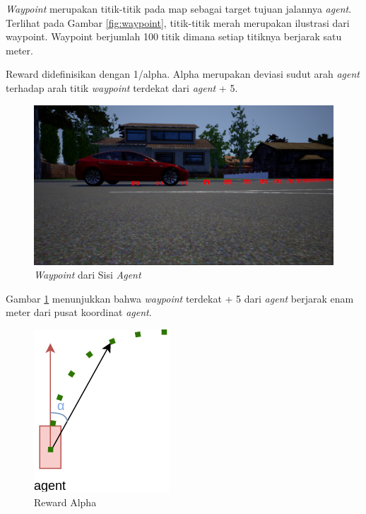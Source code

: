 \documentclass[conference]{IEEEtran}
\begin{document}
\textit{Waypoint} merupakan titik-titik pada map sebagai target tujuan jalannya \textit{agent}. Terlihat pada Gambar \ref{fig:waypoint}, titik-titik merah merupakan ilustrasi dari waypoint. Waypoint berjumlah 100 titik dimana setiap titiknya berjarak satu meter.

Reward didefinisikan dengan 1/alpha. Alpha merupakan deviasi sudut arah \textit{agent }terhadap arah titik \textit{waypoint} terdekat dari \textit{agent} + 5.

\begin{figure}[H] 
	\centering
	\includegraphics[width=1\linewidth]{images/waypoint_fromside}
	\caption{\textit{Waypoint }dari Sisi \textit{Agent}}
	\label{fig:waypoint_fromside}
\end{figure}

Gambar \ref{fig:waypoint_fromside} menunjukkan bahwa \textit{waypoint} terdekat + 5 dari \textit{agent} berjarak enam meter dari pusat koordinat \textit{agent}.

\begin{figure}[H] 
	\centering
	\includegraphics[width=.5\linewidth]{images/reward_alpha}
	\caption{Reward Alpha}
	\label{fig:reward_alpha}
\end{figure}
\end{document}
